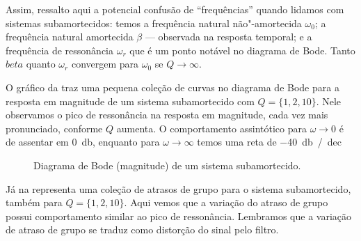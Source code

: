 Assim, ressalto aqui a potencial confusão de \enquote{frequências} quando lidamos com sistemas subamortecidos: temos a frequência natural não"-amortecida $\omega_0$; a frequência natural amortecida $\beta$ --- observada na resposta temporal; e a frequência de ressonância $\omega_r$ que é um ponto notável no diagrama de Bode. Tanto $beta$ quanto $\omega_r$ convergem para $\omega_0$ se $Q\to\infty$.

O gráfico da  traz uma pequena coleção de curvas no diagrama de Bode para a resposta em magnitude de um sistema subamortecido com $Q=\{1,2,10\}$. Nele observamos o pico de ressonância na resposta em magnitude, cada vez mais pronunciado, conforme $Q$ aumenta. O comportamento assintótico para $\omega\to0$ é de assentar em \qty{0}{\decibel}, enquanto para $\omega\to\infty$ temos uma reta de \qty{-40}{\decibel\slash dec}

\begin{figure}[ht]
	\centering
	\caption{Diagrama de Bode (magnitude) de um sistema subamortecido.}
	\label{fig:poloConjMag}
\end{figure}

Já na  representa uma coleção de atrasos de grupo para o sistema subamortecido, também para $Q=\{1,2,10\}$. Aqui vemos que a variação do atraso de grupo possui comportamento similar ao pico de ressonância. Lembramos que a variação de atraso de grupo se traduz como distorção do sinal pelo filtro.

